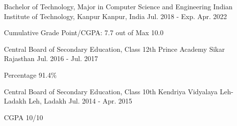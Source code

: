 

\begin{cventries}

  \cventry
    {Bachelor of Technology, Major in Computer Science and Engineering} %
    {Indian Institute of Technology, Kanpur} %
    {Kanpur, India} %
    {Jul. 2018 - Exp. Apr. 2022} %
    {
      \begin{cvitems} %
        \item {Cumulative Grade Point/CGPA: 7.7 out of Max 10.0}
      \end{cvitems}
    }
    
 \cventry
    {Central Board of Secondary Education, Class 12th} %
    {Prince Academy} %
    {Sikar Rajasthan} %
    {Jul. 2016 - Jul. 2017} %
    {
      \begin{cvitems} %
        \item {Percentage 91.4\%}
      \end{cvitems}
    }
    
  \cventry
    {Central Board of Secondary Education, Class 10th} %
    {Kendriya Vidyalaya Leh-Ladakh} %
    {Leh, Ladakh} %
    {Jul. 2014 - Apr. 2015} %
    {
      \begin{cvitems} %
        \item {CGPA 10/10}
      \end{cvitems}
    }

\end{cventries}

